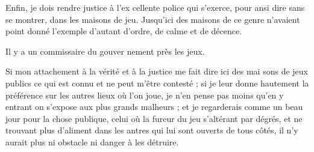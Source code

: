 Enfin, je dois rendre justice à l'ex%
cellente police qui s'exerce, pour
ansi dire sans se montrer, dans les
maisons de jeu. Jusqu'ici des maisons
de ce genre n'avaient point donné
l'exemple d'autant d'ordre, de calme
et de décence.

Il y a un commissaire du gouver%
nement près les jeux.

Si mon attachement à la vérité et
à la justice me fait dire ici des mai%
sons de jeux publics ce qui est connu
et ne peut m'être contesté ; si je leur
donne hautement la préférence sur
les autres lieux où l'on joue, je n'en
pense pas moins qu'en y entrant on
s'expose aux plus grands malheurs ;
et je regarderais comme un beau
jour pour la chose publique, celui
où la fureur du jeu s'altérant par
dégrés, et ne trouvant plus d'aliment
dans les antres qui lui sont ouverts
de tous côtés, il n'y aurait plus ni
obstacle ni danger à les détruire.
